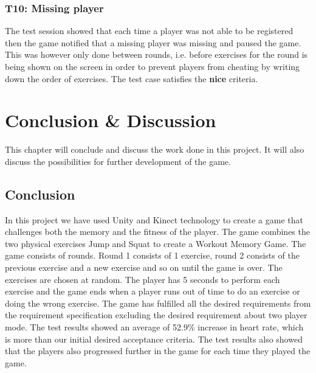 \documentclass[11pt]{report}
\begin{document}
\subsection*{T10: Missing player}
The test session showed that each time a player was not able to be registered then the game notified that a missing player was missing and paused the game. This was however only done between rounds, i.e. before exercises for the round is being shown on the screen in order to prevent players from cheating by writing down the order of exercises. The test case satisfies the \textbf{nice} criteria.

\chapter{Conclusion \& Discussion}
This chapter will conclude and discuss the work done in this project. It will also discuss the possibilities for further development of the game.

\section{Conclusion}
In this project we have used Unity and Kinect technology to create a game that challenges both the memory and the fitness of the player. The game combines the two physical exercises Jump and Squat to create a Workout Memory Game. The game consists of rounds. Round 1 consists of 1 exercise, round 2 consists of the previous exercise and a new exercise and so on until the game is over. The exercises are chosen at random. The player has 5 seconds to perform each exercise and the game ends when a player runs out of time to do an exercise or doing the wrong exercise. The game has fulfilled all the desired requirements from the requirement specification excluding the desired requirement about two player mode. The test results showed an average of 52.9\% increase in heart rate, which is more than our initial desired acceptance criteria. The test results also showed that the players also progressed further in the game for each time they played the game.
\end{document}
